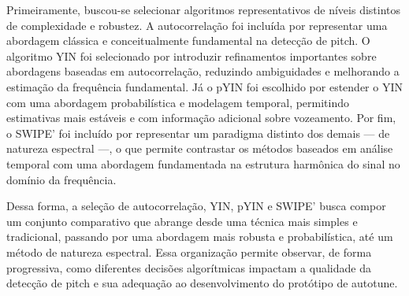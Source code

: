 Primeiramente, buscou-se selecionar algoritmos representativos de níveis distintos de complexidade e robustez. A autocorrelação foi incluída por representar uma abordagem clássica e conceitualmente fundamental na detecção de pitch. O algoritmo YIN foi selecionado por introduzir refinamentos importantes sobre abordagens baseadas em autocorrelação, reduzindo ambiguidades e melhorando a estimação da frequência fundamental. Já o pYIN foi escolhido por estender o YIN com uma abordagem probabilística e modelagem temporal, permitindo estimativas mais estáveis e com informação adicional sobre vozeamento. Por fim, o SWIPE' foi incluído por representar um paradigma distinto dos demais --- de natureza espectral ---, o que permite contrastar os métodos baseados em análise temporal com uma abordagem fundamentada na estrutura harmônica do sinal no domínio da frequência.

Dessa forma, a seleção de autocorrelação, YIN, pYIN e SWIPE' busca compor um conjunto comparativo que abrange desde uma técnica mais simples e tradicional, passando por uma abordagem mais robusta e probabilística, até um método de natureza espectral. Essa organização permite observar, de forma progressiva, como diferentes decisões algorítmicas impactam a qualidade da detecção de pitch e sua adequação ao desenvolvimento do protótipo de autotune.

